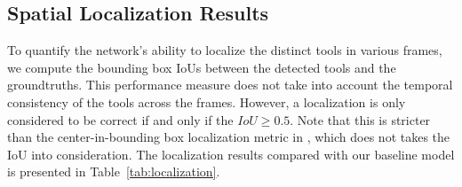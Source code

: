 \documentclass{svjour3}                     \smartqed
\begin{document}
\subsection{Spatial Localization Results}
\label{sec:spatial_localization}
To quantify the network's ability to localize the distinct tools in various frames, we compute the bounding box IoUs between the detected tools and the groundtruths.
This performance measure does not take into account the temporal consistency of the tools across the frames.
However, a localization is only considered to be correct if and only if the $IoU\geq0.5$.
Note that this is stricter than the center-in-bounding box localization metric in \cite{miccai:vardazaryan2018weakly}, which does not takes the IoU into consideration.
The localization results compared with our baseline model is presented in Table~\ref{tab:localization}. 
\end{document}
